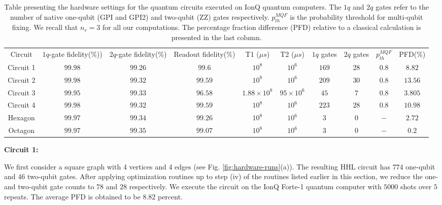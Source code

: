 \documentclass[%
 reprint,
 superscriptaddress,
 amsmath,amssymb,
 aps,
 pra,
floatfix,
nofootinbib,
]{revtex4-2}
\theoremstyle{definition}
\theoremstyle{remark}
\begin{document}
\begin{table}[t]
    \centering
    \begin{ruledtabular}
    \caption{\label{tab:hardware} Table presenting the hardware settings for the quantum circuits executed on IonQ quantum computers. The $1q$ and $2q$ gates refer to the number of native one-qubit (GPI and GPI2) and two-qubit (ZZ) gates respectively. $p_{th}^{MQF}$ is the probability threshold for multi-qubit fixing. We recall that $n_r=3$ for all our computations. The percentage fraction difference (PFD) relative to a classical calculation is presented in the last column. } 
    \begin{tabular}{c|ccccccccc}
         \textrm{Circuit}&
          \textrm{$1q$-gate fidelity(\%))} &
          \textrm{$2q$-gate fidelity(\%) } &
          \textrm{Readout fidelity(\%)} &
          \textrm{T1 ($\mu s$)} & 
          \textrm{T2 ($\mu s$)} &
          
          \textrm{$1q$ gates} & 
          \textrm{$2q$ gates} &
          \textrm{$p_{th}^{MQF}$} & 
          \textrm{PFD(\%)}\\
         \colrule
         Circuit 1 & $99.98$ & $99.26$ & $99.6$ & $10^8$ & $10^6$ & $169$ & $28$ & $0.8$ & $8.82$ \\
         Circuit 2 & $99.98$ & $99.32$ & $99.59$ & $10^8$ & $10^6$ & $209$ & $30$ &$0.8$& $13.56$ \\
         Circuit 3 & $99.95$ & $99.33$ & $96.58$ & $1.88\times 10^8$ & $95 \times 10^6$ & $45$ & $7$ &$0.8$& $3.805$ \\
         Circuit 4 & $99.98$ & $99.32$ & $99.59$ & $10^8$ & $10^6$ & $223$ & $28$ &$0.8$& $10.98$ \\
         Hexagon & $99.97$ & $99.34$ & $99.26$ & $10^8$ & $10^6$ & $3$ & $0$ & $-$ & $2.72$ \\
         Octagon & $99.97$ & $99.35$ & $99.07$ & $10^8$ & $10^6$ & $3$ & $0$ &$-$& $0.2$ \\
     \end{tabular}
    \end{ruledtabular}
\end{table} 

\noindent \textbf{Circuit 1: } 

We first consider a square graph with 4 vertices and 4 edges (see Fig. \ref{fig:hardware-runs}(a)). The resulting HHL circuit has $774$ one-qubit  and $46$ two-qubit gates. After applying optimization routines up to step (iv) of the routines listed earlier in this section, we reduce the one- and two-qubit gate counts to $78$ and $28$ respectively. We execute the circuit on the IonQ Forte-1 quantum computer with $5000$ shots over $5$ repeats. The average PFD is obtained to be $8.82$ percent. \\
\end{document}
